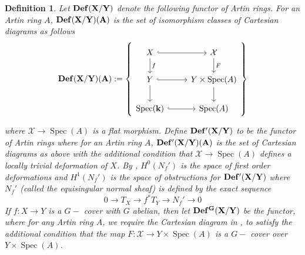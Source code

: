 \documentclass[12pt,twoside,]{amsart}
\theoremstyle{plain}
\newtheorem{definition}[theorem]{Definition}
\theoremstyle{definition}
\begin{document}
\begin{definition}
\label{def with fixed target}
    Let $\bf Def(X/Y)$ denote the following functor of Artin rings. For an Artin ring $A$, $\bf Def(X/Y)(A)$ is the set of isomorphism classes of Cartesian diagrams as follows
$$  \bf Def(X/Y)(A) := \left\{ 
    \begin{tikzcd}
     X \arrow[r, hook] \arrow[d, "f"] & \mathcal{X} \arrow[d, "F"] \\
     Y \arrow[r, hook] \arrow[d] & Y \times \textrm{Spec}(A) \arrow[d] \\
     \textrm{Spec}(\mathbf{k}) \arrow[r, hook] & \textrm{Spec}(A) 
    \end{tikzcd}
\right\}
$$

where $\mathcal{X} \to \operatorname{Spec}(A)$ is a flat morphism. Define $\bf Def'(X/Y)$ to be the functor of Artin rings where for an Artin ring $A$, $\bf Def'(X/Y)(A)$ is the set of Cartesian diagrams as above with the additional condition that $\mathcal{X} \to \operatorname{Spec}(A)$ defines a locally trivial deformation of $X$.  
By \cite[Theorem $3.4.8$, Lemma $3.4.7$, Definition $3.4.5$]{sernesi2006deformations}, $H^0(N_f')$ is the space of first order deformations and $H^1(N_f')$ is the space of obstructions for $\bf Def'(X/Y)$ where $N_f'$ (called the equisingular normal sheaf) is defined by the exact sequence 
$$0 \to T_X \to f^*T_Y \to N_f' \to 0$$
If $f: X \to Y$ is a $G-$ cover with $G$ abelian, then let $\bf Def^G(X/Y)$ be the functor, where for any Artin ring $A$, we require the Cartesian diagram in , to satisfy the additional condition that the map $F: \mathcal{X} \to Y \times \operatorname{Spec}(A)$ is a $G-$ cover over $Y \times \operatorname{Spec}(A)$.   
\end{definition}
\end{document}
